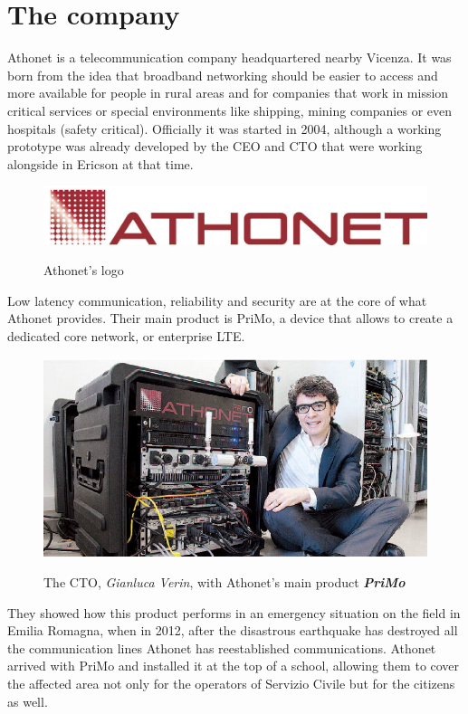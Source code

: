 \section{The company}

	Athonet is a telecommunication company headquartered nearby Vicenza.
	It was born from the idea that broadband networking should be easier to access and more available for people in rural areas and for companies that work in mission critical services or special environments like shipping, mining companies or even hospitals (safety critical).
	Officially it was started in 2004, although a working prototype was already developed by the CEO and CTO that were working alongside in Ericson at that time.
	\begin{figure}[H]
		\centering
		\includegraphics[width=.7\textwidth]{resources/ath_logo}\\
		\caption{Athonet's logo}
	\end{figure}
	Low latency communication, reliability and security are at the core of what Athonet provides.
	Their main product is PriMo, a device that allows to create a dedicated core network, or enterprise LTE.
	\begin{figure}[H]
		\centering
		\includegraphics[width=.7\textwidth]{resources/gianluca_primo}\\
		\caption{The CTO, \textit{Gianluca Verin}, with Athonet's main product \textbf{\textit{PriMo}}}
	\end{figure}
	They showed how this product performs in an emergency situation on the field in Emilia Romagna, when in 2012, after the disastrous earthquake has destroyed all the communication lines Athonet has reestablished communications.
	Athonet arrived with PriMo and installed it at the top of a school, allowing them to cover the affected area not only for the operators of Servizio Civile but for the citizens as well.
